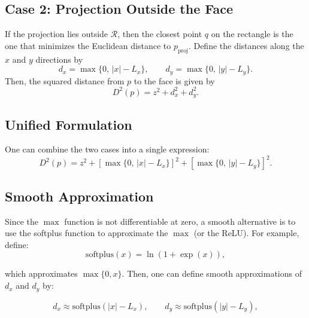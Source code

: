 \documentclass[11pt]{article}
\begin{document}
    \subsection*{Case 2: Projection Outside the Face}

        If the projection lies outside \(\mathcal{R}\), then the closest point \(q\) on the rectangle is the one that minimizes the Euclidean distance to \(p_{\text{proj}}\). Define the distances along the \(x\) and \(y\) directions by
        \begin{equation}
            d_x = \max\{0,\, |x| - L_x\}, \qquad
            d_y = \max\{0,\, |y| - L_y\}.
        \end{equation}
        Then, the squared distance from \(p\) to the face is given by
        \begin{equation}
            D^2(p) = z^2 + d_x^2 + d_y^2.
        \end{equation}

    \subsection*{Unified Formulation}

        One can combine the two cases into a single expression:
        \begin{equation}
            D^2(p) = z^2 + \left[ \max\{0,\, |x| - L_x\} \right]^2 + \left[ \max\{0,\, |y| - L_y\} \right]^2.
        \end{equation}

    \subsection*{Smooth Approximation}

        Since the \(\max\) function is not differentiable at zero, a smooth alternative is to use the softplus function to approximate the \(\max\) (or the ReLU). For example, define:
        \begin{equation}
            \text{softplus}(x) = \ln\left(1+\exp(x)\right),
        \end{equation}

        which approximates \(\max\{0,x\}\). Then, one can define smooth approximations of \(d_x\) and \(d_y\) by:

        \begin{equation}
            d_x \approx \text{softplus}(|x| - L_x), \qquad
            d_y \approx \text{softplus}(|y| - L_y),
        \end{equation}
\end{document}
